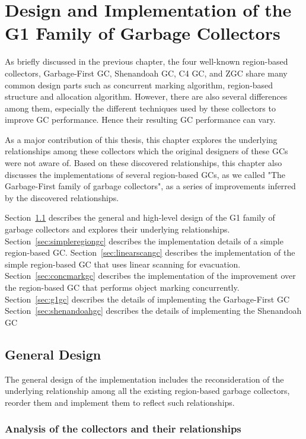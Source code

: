 \chapter{Design and Implementation of the G1 Family of Garbage Collectors}
\label{cha:implementation}

As briefly discussed in the previous chapter, the four well-known region-based collectors, Garbage-First GC, Shenandoah GC, C4 GC, and
ZGC share many common design parts such as concurrent marking algorithm, region-based
structure and allocation algorithm. However, there are also several differences
among them, especially the different techniques used by these collectors to improve GC performance.
Hence their resulting GC performance can vary.

As a major contribution of this thesis, this chapter explores the underlying relationships
among these collectors which the original designers of these GCs were not aware of.
Based on these discovered relationships, this chapter also discusses the implementations
of several region-based GCs, as we called "The Garbage-First family of garbage collectors",
as a series of improvements inferred by the discovered relationships.

Section~\ref{sec:generaldesign} describes the general and high-level design of the
G1 family of garbage collectors and explores their underlying relationships.
Section~\ref{sec:simpleregiongc} describes the implementation details of a simple region-based GC.
Section~\ref{sec:linearscangc} describes the implementation of the simple region-based GC that uses linear scanning for evacuation.
Section~\ref{sec:concmarkgc} describes the implementation of the improvement over the region-based GC that performs object marking concurrently.
Section~\ref{sec:g1gc} describes the details of implementing the Garbage-First GC
Section~\ref{sec:shenandoahgc} describes the details of implementing the Shenandoah GC



\section{General Design}
\label{sec:generaldesign}

The general design of the implementation includes the reconsideration of the underlying
relationship among all the existing region-based garbage collectors, reorder them
and implement them to reflect such relationships.

\subsection{Analysis of the collectors and their relationships}

